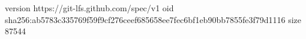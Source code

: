 version https://git-lfs.github.com/spec/v1
oid sha256:ab5783c335769f59f9cf276ceef685658ee7fec6bf1eb90bb7855fe3f79d1116
size 87544
